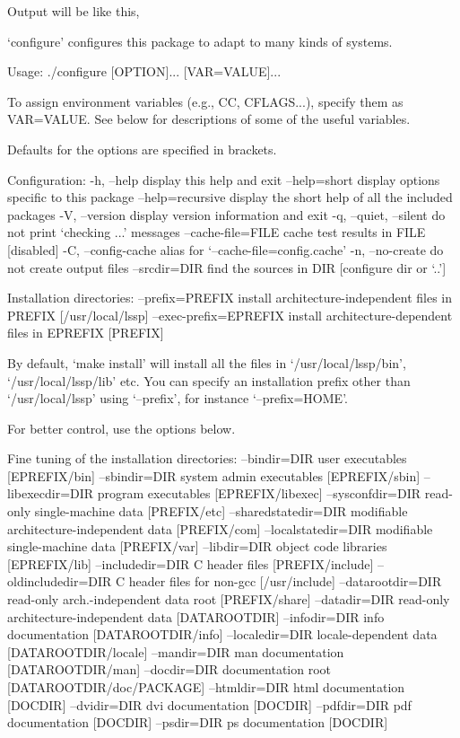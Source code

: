 Output will be like this,
\begin{evb}
`configure' configures this package to adapt to many kinds of systems.

Usage: ./configure [OPTION]... [VAR=VALUE]...

To assign environment variables (e.g., CC, CFLAGS...), specify them as
VAR=VALUE.  See below for descriptions of some of the useful variables.

Defaults for the options are specified in brackets.

Configuration:
  -h, --help              display this help and exit
      --help=short        display options specific to this package
      --help=recursive    display the short help of all the included packages
  -V, --version           display version information and exit
  -q, --quiet, --silent   do not print `checking ...' messages
      --cache-file=FILE   cache test results in FILE [disabled]
  -C, --config-cache      alias for `--cache-file=config.cache'
  -n, --no-create         do not create output files
      --srcdir=DIR        find the sources in DIR [configure dir or `..']

Installation directories:
  --prefix=PREFIX         install architecture-independent files in PREFIX
                          [/usr/local/lssp]
  --exec-prefix=EPREFIX   install architecture-dependent files in EPREFIX
                          [PREFIX]

By default, `make install' will install all the files in
`/usr/local/lssp/bin', `/usr/local/lssp/lib' etc.  You can specify
an installation prefix other than `/usr/local/lssp' using `--prefix',
for instance `--prefix=HOME'.

For better control, use the options below.

Fine tuning of the installation directories:
  --bindir=DIR            user executables [EPREFIX/bin]
  --sbindir=DIR           system admin executables [EPREFIX/sbin]
  --libexecdir=DIR        program executables [EPREFIX/libexec]
  --sysconfdir=DIR        read-only single-machine data [PREFIX/etc]
  --sharedstatedir=DIR    modifiable architecture-independent data [PREFIX/com]
  --localstatedir=DIR     modifiable single-machine data [PREFIX/var]
  --libdir=DIR            object code libraries [EPREFIX/lib]
  --includedir=DIR        C header files [PREFIX/include]
  --oldincludedir=DIR     C header files for non-gcc [/usr/include]
  --datarootdir=DIR       read-only arch.-independent data root [PREFIX/share]
  --datadir=DIR           read-only architecture-independent data [DATAROOTDIR]
  --infodir=DIR           info documentation [DATAROOTDIR/info]
  --localedir=DIR         locale-dependent data [DATAROOTDIR/locale]
  --mandir=DIR            man documentation [DATAROOTDIR/man]
  --docdir=DIR            documentation root [DATAROOTDIR/doc/PACKAGE]
  --htmldir=DIR           html documentation [DOCDIR]
  --dvidir=DIR            dvi documentation [DOCDIR]
  --pdfdir=DIR            pdf documentation [DOCDIR]
  --psdir=DIR             ps documentation [DOCDIR]


\end{evb}
